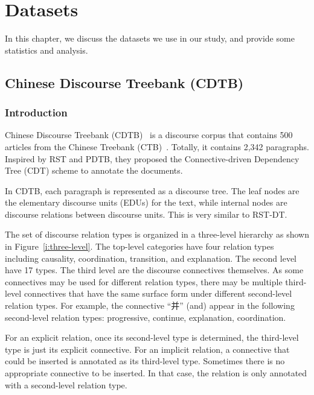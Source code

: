 %
%
%
\chapter{Datasets}
\label{c:datasets}

In this chapter, we discuss the datasets we use in our study, and
provide some statistics and analysis.

\section{Chinese Discourse Treebank (CDTB)}
\label{s:CDTB}
\subsection{Introduction}

Chinese Discourse Treebank (CDTB)~\citep{li2014building} is a discourse
corpus that contains 500 articles from the Chinese Treebank (CTB)~\citep{xue2005penn}.
Totally, it contains 2,342 paragraphs.
Inspired by RST and PDTB, they proposed the Connective-driven Dependency Tree (CDT)
scheme to annotate the documents.

In CDTB, each paragraph is represented as a discourse tree. The leaf nodes are the
elementary discourse units (EDUs) for the text, while internal nodes are discourse
relations between discourse units. This is very similar to RST-DT.

The set of discourse relation types is organized in a three-level hierarchy as
shown in Figure~\ref{i:three-level}.
The top-level categories have four relation types including causality, coordination,
transition, and explanation. The second level
have 17 types. The third level are the discourse connectives themselves.
As some connectives may be used for different relation types, there may
be multiple third-level connectives that have the same surface form under
different second-level relation types. For example, the connective
``并'' (and) appear in the following second-level relation types:
progressive, continue, explanation, coordination.



For an explicit relation, once its second-level type is determined, the
third-level type is just its explicit connective. For an implicit relation,
a connective that could be inserted is annotated as its third-level type.
Sometimes there is no appropriate connective to be inserted. In that case,
the relation is only annotated with a second-level relation type.


